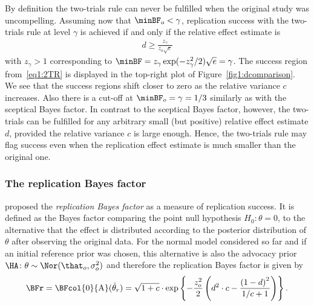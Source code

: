 By definition the two-trials rule can never be fulfilled when the original study
was uncompelling. Assuming now that $\minBF_{o} < \gamma$, replication success
with the two-trials rule at level $\gamma$ is achieved if and only if the
relative effect estimate is
\begin{align}
  \label{eq1:2TR}
  d \geq \frac{z_{\gamma}}{z_{o} \sqrt{c}}
\end{align}
with $z_{\gamma} > 1$ corresponding to
$\minBF = z_{\gamma}\exp(-z_{\gamma}^{2}/2)\sqrt{e} = \gamma$. The success
region from~\eqref{eq1:2TR} is displayed in the top-right plot of
Figure~\ref{fig1:dcomparison}. We see that the success regions shift closer to
zero as the relative variance $c$ increases. Also there is a cut-off at
$\minBF_{o} = \gamma = 1/3$ similarly as with the sceptical Bayes factor. In
contrast to the sceptical Bayes factor, however, the two-trials can be fulfilled
for any arbitrary small (but positive) relative effect estimate $d$, provided
the relative variance $c$ is large enough. Hence, the two-trials rule may flag
success even when the replication effect estimate is much smaller than the
original one.

\subsubsection{The replication Bayes factor}
\citet{Verhagen2014} proposed the \emph{replication Bayes factor} as a measure
of replication success. It is defined as the Bayes factor comparing the point
null hypothesis $H_0 \colon \theta = 0$, to the alternative that the effect is
distributed according to the posterior distribution of $\theta$ after observing
the original data. For the normal model considered so far and if an initial
reference prior was chosen, this alternative is also the advocacy prior
$\HA \colon \theta \sim \Nor(\that_o, \sigma^2_o)$ and therefore the replication
Bayes factor is given by
\begin{align}
  \label{eq1:BFrep}
  \BFr
  = \BFcol{\mathrm{0}}{\mathrm{A}}(\hat{\theta}_r)
  = \sqrt{1 + c} \cdot
  \exp\left\{-\frac{z_o^2}{2} \left(d^2 \cdot c -
  \frac{\left(1 - d\right)^2}{1/c + 1} \right)\right\}.
\end{align}

